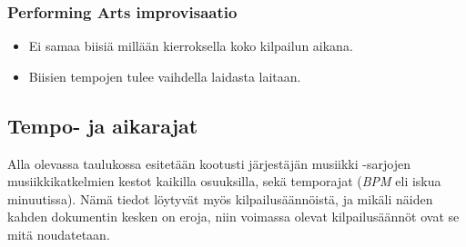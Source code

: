 \documentclass[12pt, a4paper, oneside]{article}
\begin{document}
\subsubsection{Performing Arts improvisaatio}

\begin{itemize}[itemsep=-2pt]
    \item Ei samaa biisiä millään kierroksella koko kilpailun aikana.
    \item Biisien tempojen tulee vaihdella laidasta laitaan.
\end{itemize}

\subsection{Tempo- ja aikarajat} \label{subsec:rajat}

Alla olevassa taulukossa esitetään kootusti järjestäjän musiikki -sarjojen musiikkikatkelmien kestot kaikilla osuuksilla,
sekä temporajat (\textit{BPM} eli iskua minuutissa).
Nämä tiedot löytyvät myös kilpailusäännöistä,
ja mikäli näiden kahden dokumentin kesken on eroja,
niin voimassa olevat kilpailusäännöt ovat se mitä noudatetaan.
\end{document}
